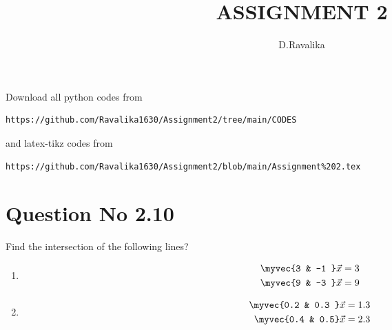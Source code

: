 \documentclass[journal,12pt,twocolumn]{IEEEtran}
\begin{document}
     \def\rightbox#1{\makebox[0in][r]{#1}}
     \def\centbox#1{\makebox[0in]{#1}}
     \def\topbox#1{\raisebox{-\baselineskip}[0in][0in]{#1}}
     \def\midbox#1{\raisebox{-0.5\baselineskip}[0in][0in]{#1}}
\vspace{3cm}
\title{ASSIGNMENT 2}
\author{D.Ravalika}
\maketitle
\newpage
\bigskip
\renewcommand{\thefigure}{\theenumi}
\renewcommand{\thetable}{\theenumi}
Download all python codes from 
\begin{lstlisting}
https://github.com/Ravalika1630/Assignment2/tree/main/CODES
\end{lstlisting}
%
and latex-tikz codes from 
%
\begin{lstlisting}
https://github.com/Ravalika1630/Assignment2/blob/main/Assignment%202.tex
\end{lstlisting}
%
\section{Question No 2.10}
Find the intersection of the following lines?
%
\begin{enumerate}
\item
\begin{align}
\begin{split}
\myvec{3 & -1 }\vec{x}&=3
\\
\myvec{9 &  -3 }\vec{x}&=9 \label{1.0.1}
\end{split}
\end{align}
\item
\begin{align}
\begin{split}
\myvec{0.2 & 0.3 }\vec{x}&=1.3
\\
\myvec{0.4 & 0.5}\vec{x}&=2.3 \label{1.0.2}
\end{split}
\end{align}

\end{enumerate}
%
\end{document}
